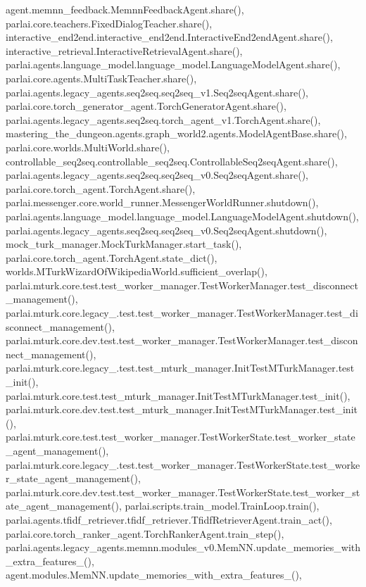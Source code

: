 agent.\+memnn\+\_\+feedback.\+Memnn\+Feedback\+Agent.\+share(), parlai.\+core.\+teachers.\+Fixed\+Dialog\+Teacher.\+share(), interactive\+\_\+end2end.\+interactive\+\_\+end2end.\+Interactive\+End2end\+Agent.\+share(), interactive\+\_\+retrieval.\+Interactive\+Retrieval\+Agent.\+share(), parlai.\+agents.\+language\+\_\+model.\+language\+\_\+model.\+Language\+Model\+Agent.\+share(), parlai.\+core.\+agents.\+Multi\+Task\+Teacher.\+share(), parlai.\+agents.\+legacy\+\_\+agents.\+seq2seq.\+seq2seq\+\_\+v1.\+Seq2seq\+Agent.\+share(), parlai.\+core.\+torch\+\_\+generator\+\_\+agent.\+Torch\+Generator\+Agent.\+share(), parlai.\+agents.\+legacy\+\_\+agents.\+seq2seq.\+torch\+\_\+agent\+\_\+v1.\+Torch\+Agent.\+share(), mastering\+\_\+the\+\_\+dungeon.\+agents.\+graph\+\_\+world2.\+agents.\+Model\+Agent\+Base.\+share(), parlai.\+core.\+worlds.\+Multi\+World.\+share(), controllable\+\_\+seq2seq.\+controllable\+\_\+seq2seq.\+Controllable\+Seq2seq\+Agent.\+share(), parlai.\+agents.\+legacy\+\_\+agents.\+seq2seq.\+seq2seq\+\_\+v0.\+Seq2seq\+Agent.\+share(), parlai.\+core.\+torch\+\_\+agent.\+Torch\+Agent.\+share(), parlai.\+messenger.\+core.\+world\+\_\+runner.\+Messenger\+World\+Runner.\+shutdown(), parlai.\+agents.\+language\+\_\+model.\+language\+\_\+model.\+Language\+Model\+Agent.\+shutdown(), parlai.\+agents.\+legacy\+\_\+agents.\+seq2seq.\+seq2seq\+\_\+v0.\+Seq2seq\+Agent.\+shutdown(), mock\+\_\+turk\+\_\+manager.\+Mock\+Turk\+Manager.\+start\+\_\+task(), parlai.\+core.\+torch\+\_\+agent.\+Torch\+Agent.\+state\+\_\+dict(), worlds.\+M\+Turk\+Wizard\+Of\+Wikipedia\+World.\+sufficient\+\_\+overlap(), parlai.\+mturk.\+core.\+test.\+test\+\_\+worker\+\_\+manager.\+Test\+Worker\+Manager.\+test\+\_\+disconnect\+\_\+management(), parlai.\+mturk.\+core.\+legacy\+\_.\+test.\+test\+\_\+worker\+\_\+manager.\+Test\+Worker\+Manager.\+test\+\_\+disconnect\+\_\+management(), parlai.\+mturk.\+core.\+dev.\+test.\+test\+\_\+worker\+\_\+manager.\+Test\+Worker\+Manager.\+test\+\_\+disconnect\+\_\+management(), parlai.\+mturk.\+core.\+legacy\+\_.\+test.\+test\+\_\+mturk\+\_\+manager.\+Init\+Test\+M\+Turk\+Manager.\+test\+\_\+init(), parlai.\+mturk.\+core.\+test.\+test\+\_\+mturk\+\_\+manager.\+Init\+Test\+M\+Turk\+Manager.\+test\+\_\+init(), parlai.\+mturk.\+core.\+dev.\+test.\+test\+\_\+mturk\+\_\+manager.\+Init\+Test\+M\+Turk\+Manager.\+test\+\_\+init(), parlai.\+mturk.\+core.\+test.\+test\+\_\+worker\+\_\+manager.\+Test\+Worker\+State.\+test\+\_\+worker\+\_\+state\+\_\+agent\+\_\+management(), parlai.\+mturk.\+core.\+legacy\+\_.\+test.\+test\+\_\+worker\+\_\+manager.\+Test\+Worker\+State.\+test\+\_\+worker\+\_\+state\+\_\+agent\+\_\+management(), parlai.\+mturk.\+core.\+dev.\+test.\+test\+\_\+worker\+\_\+manager.\+Test\+Worker\+State.\+test\+\_\+worker\+\_\+state\+\_\+agent\+\_\+management(), parlai.\+scripts.\+train\+\_\+model.\+Train\+Loop.\+train(), parlai.\+agents.\+tfidf\+\_\+retriever.\+tfidf\+\_\+retriever.\+Tfidf\+Retriever\+Agent.\+train\+\_\+act(), parlai.\+core.\+torch\+\_\+ranker\+\_\+agent.\+Torch\+Ranker\+Agent.\+train\+\_\+step(), parlai.\+agents.\+legacy\+\_\+agents.\+memnn.\+modules\+\_\+v0.\+Mem\+N\+N.\+update\+\_\+memories\+\_\+with\+\_\+extra\+\_\+features\+\_\+(), agent.\+modules.\+Mem\+N\+N.\+update\+\_\+memories\+\_\+with\+\_\+extra\+\_\+features\+\_\+(), 
